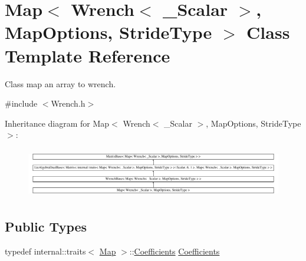 \hypertarget{class_map_3_01_wrench_3_01___scalar_01_4_00_01_map_options_00_01_stride_type_01_4}{}\section{Map$<$ Wrench$<$ \+\_\+\+Scalar $>$, Map\+Options, Stride\+Type $>$ Class Template Reference}
\label{class_map_3_01_wrench_3_01___scalar_01_4_00_01_map_options_00_01_stride_type_01_4}


Class map an array to wrench.  




{\ttfamily \#include $<$Wrench.\+h$>$}

Inheritance diagram for Map$<$ Wrench$<$ \+\_\+\+Scalar $>$, Map\+Options, Stride\+Type $>$\+:\begin{figure}[H]
\begin{center}
\leavevmode
\includegraphics[height=2.200393cm]{class_map_3_01_wrench_3_01___scalar_01_4_00_01_map_options_00_01_stride_type_01_4}
\end{center}
\end{figure}
\subsection*{Public Types}
\begin{DoxyCompactItemize}
\item 
typedef internal\+::traits$<$ \hyperlink{class_map_3_01_wrench_3_01___scalar_01_4_00_01_map_options_00_01_stride_type_01_4_ab778c7158f5d29d76672346ecfe4e3ea}{Map} $>$\+::\hyperlink{class_map_3_01_wrench_3_01___scalar_01_4_00_01_map_options_00_01_stride_type_01_4_abfc1bf3f7dc1d3051325edad634172e8}{Coefficients} \hyperlink{class_map_3_01_wrench_3_01___scalar_01_4_00_01_map_options_00_01_stride_type_01_4_abfc1bf3f7dc1d3051325edad634172e8}{Coefficients}
\end{DoxyCompactItemize}
